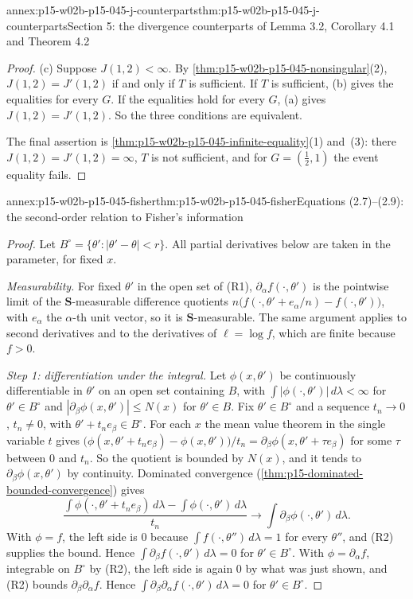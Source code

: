 \begin{annexitem}{annex:p15-w02b-p15-045-j-counterparts}{thm:p15-w02b-p15-045-j-counterparts}{Section 5: the divergence counterparts of Lemma 3.2, Corollary 4.1 and Theorem 4.2}
\begin{proof}
(c) Suppose \(J(1,2)<\infty\). By
\cref{thm:p15-w02b-p15-045-nonsingular}(2), \(J(1,2)=J'(1,2)\) if and only
if \(T\) is sufficient. If \(T\) is sufficient, (b) gives the equalities
for every \(G\). If the equalities hold for every \(G\), (a) gives
\(J(1,2)=J'(1,2)\). So the three conditions are equivalent.

The final assertion is \cref{thm:p15-w02b-p15-045-infinite-equality}(1)
and~(3): there \(J(1,2)=J'(1,2)=\infty\), \(T\) is not sufficient, and
for \(G=(\tfrac12,1)\) the event equality fails.
\end{proof}
\end{annexitem}

\begin{annexitem}{annex:p15-w02b-p15-045-fisher}{thm:p15-w02b-p15-045-fisher}{Equations (2.7)--(2.9): the second-order relation to Fisher's information}
\begin{proof}
Let \(B^\circ=\{\theta':|\theta'-\theta|<r\}\). All partial derivatives
below are taken in the parameter, for fixed \(x\).

\emph{Measurability.} For fixed \(\theta'\) in the open set of (R1),
\(\partial_\alpha f(\cdot,\theta')\) is the pointwise limit of the
\(\mathbf S\)-measurable difference quotients
\(n\bigl(f(\cdot,\theta'+e_\alpha/n)-f(\cdot,\theta')\bigr)\), with
\(e_\alpha\) the \(\alpha\)-th unit vector, so it is
\(\mathbf S\)-measurable. The same argument applies to second
derivatives and to the derivatives of \(\ell=\log f\), which are finite
because \(f>0\).

\emph{Step 1: differentiation under the integral.} Let \(\phi(x,\theta')\)
be continuously differentiable in \(\theta'\) on an open set containing
\(B\), with \(\int|\phi(\cdot,\theta')|\,d\lambda<\infty\) for
\(\theta'\in B^\circ\) and \(|\partial_\beta\phi(x,\theta')|\leq N(x)\)
for \(\theta'\in B\). Fix \(\theta'\in B^\circ\) and a sequence
\(t_n\to0\), \(t_n\neq0\), with \(\theta'+t_ne_\beta\in B^\circ\). For each
\(x\) the mean value theorem in the single variable \(t\) gives
\(\bigl(\phi(x,\theta'+t_ne_\beta)-\phi(x,\theta')\bigr)/t_n=\partial_\beta\phi(x,\theta'+\tau e_\beta)\)
for some \(\tau\) between \(0\) and \(t_n\). So the quotient is bounded
by \(N(x)\), and it tends to \(\partial_\beta\phi(x,\theta')\) by
continuity. Dominated convergence
(\cref{thm:p15-dominated-bounded-convergence}) gives
\[
  \frac{\int\phi(\cdot,\theta'+t_ne_\beta)\,d\lambda-\int\phi(\cdot,\theta')\,d\lambda}{t_n}
  \to\int\partial_\beta\phi(\cdot,\theta')\,d\lambda .
\]
With \(\phi=f\), the left side is \(0\) because
\(\int f(\cdot,\theta'')\,d\lambda=1\) for every \(\theta''\), and (R2)
supplies the bound. Hence
\(\int\partial_\beta f(\cdot,\theta')\,d\lambda=0\) for
\(\theta'\in B^\circ\). With \(\phi=\partial_\alpha f\), integrable on
\(B^\circ\) by (R2), the left side is again \(0\) by what was just
shown, and (R2) bounds \(\partial_\beta\partial_\alpha f\). Hence
\(\int\partial_\beta\partial_\alpha f(\cdot,\theta')\,d\lambda=0\) for
\(\theta'\in B^\circ\).


\end{proof}
\end{annexitem}
